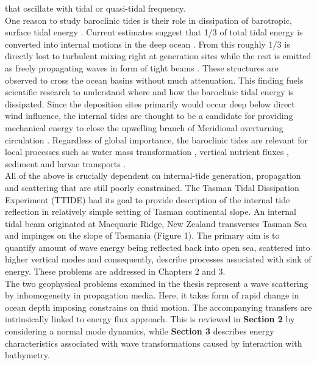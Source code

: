 \documentclass[12pt]{article}
\begin{document}
that oscillate with tidal or quasi-tidal frequency.\\
One reason to study baroclinic tides is their role in dissipation of barotropic, surface tidal 
energy \citep{munk1997once}. Current estimates suggest that 1/3 of total tidal energy is 
converted into internal motions in the deep ocean \citep{egbert2000significant}. From this roughly 
1/3 is directly lost to turbulent mixing right at generation sites \citep{st2002role} while the 
rest is emitted as freely propagating waves in form of tight beams \citep{simmons2004tidally, 
zhao2016global}. These structures are observed to cross the ocean basins without much 
attenuation. This finding fuels scientific research to understand where and how the baroclinic 
tidal energy is dissipated. Since the deposition sites primarily would occur deep below direct 
wind influence, the internal tides are thought to be a candidate for providing mechanical energy to 
close the upwelling branch of Meridional overturning circulation \citep{munk1998abyssal}. 
Regardless of global importance, the baroclinic tides are relevant for local processes such as 
water mass transformation \citep{stigebrandt1989vertical}, vertical nutrient fluxes 
\citep{sharples2007spring}, sediment \citep{hotchkiss1982internal} and larvae transports 
\citep{pineda1999circulation}.\\
All of the above is crucially dependent on internal-tide generation, propagation and scattering 
that are still poorly constrained. The Tasman Tidal Dissipation Experiment (TTIDE) had its 
goal to provide description of the internal tide reflection in relatively simple setting of Tasman 
continental slope. An internal tidal beam originated at Macquarie Ridge, New Zealand transverses 
Tasman Sea and impinges on the slope of Tasmania (Figure 1). The primary aim is to quantify amount 
of wave energy being reflected back into open sea, scattered into higher vertical modes and 
consequently, describe processes associated with sink of energy. These problems are addressed in 
Chapters 2 and 3.\\
The two geophysical problems examined in the thesis represent a wave scattering by 
inhomogeneity in propagation media. Here, it takes form of rapid change in ocean depth imposing 
constrains on fluid motion. The accompanying transfers are intrinsically linked to energy flux 
approach. This is reviewed in \textbf{Section 2} by considering a normal mode dynamics, while 
\textbf{Section 3} describes energy characteristics associated with wave transformations caused by 
interaction with bathymetry.\\
\end{document}
